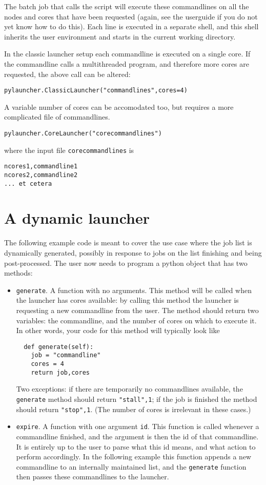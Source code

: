 \documentclass[11pt]{artikel3}
\newcommand\n[1]{{\tt #1}}
\begin{document}
The batch job that calls the script will execute these commandlines on
all the nodes and cores that have been requested (again, see the
userguide if you do not yet know how to do this). Each line is
executed in a separate shell, and this shell inherits the user
environment and starts in the current working directory.

In the classic launcher setup each commandline is executed on a single
core. If the commandline calls a multithreaded program, and therefore
more cores are requested, the above call can be altered:
\begin{verbatim}
pylauncher.ClassicLauncher("commandlines",cores=4)
\end{verbatim}

A variable number of cores can be accomodated too, but requires a more
complicated file of commandlines. 
\begin{verbatim}
pylauncher.CoreLauncher("corecommandlines")
\end{verbatim}
where the input file \n{corecommandlines} is
\begin{verbatim}
ncores1,commandline1
ncores2,commandline2
... et cetera
\end{verbatim}

\section{A dynamic launcher}

The following example code is meant to cover the use case where the
job list is dynamically generated, possibly in response to jobs on the
list finishing and being post-processed. The user now needs to program
a python object that has two methods:
\begin{itemize}
\item \n{generate}. A function with no arguments. This method will be
  called when the launcher has cores available: by calling this method
  the launcher is requesting a new commandline from the user. The
  method should return two variables: the commandline, and the number
  of cores on which to execute it. In other words, your code for this
  method will typically look like
\begin{verbatim}
  def generate(self):
    job = "commandline"
    cores = 4
    return job,cores
\end{verbatim}
  Two exceptions: if there are temporarily no commandlines available,
  the \n{generate} method should return \n{"stall",1}; if the job is
  finished the method should return \n{"stop",1}. (The number of cores
  is irrelevant in these cases.)
\item \n{expire}. A function with one argument \n{id}. This function
  is called whenever a commandline finished, and the argument is then
  the id of that commandline. It is entirely up to the user to parse
  what this id means, and what action to perform
  accordingly. In the following example this function appends a new
  commandline to an internally maintained list, and the \n{generate}
  function then passes these commandlines to the launcher.
\end{itemize}
\end{document}
